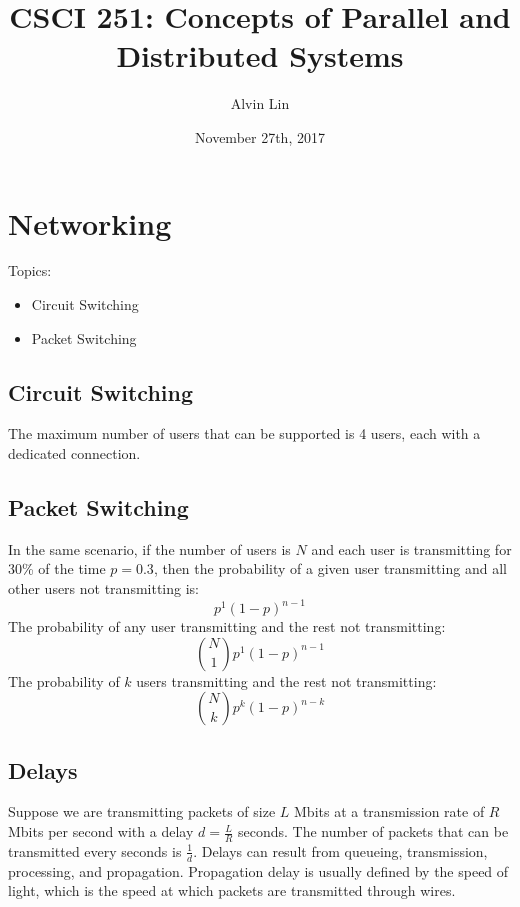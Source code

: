 \documentclass{math}
\title{CSCI 251: Concepts of Parallel and Distributed Systems}
\author{Alvin Lin}
\date{November 27th, 2017}
\begin{document}
\maketitle

\section*{Networking}
Topics:
\begin{itemize}
  \item Circuit Switching
  \item Packet Switching
\end{itemize}

\subsection*{Circuit Switching}
\begin{center}
\end{center}
The maximum number of users that can be supported is 4 users, each with a
dedicated connection.

\subsection*{Packet Switching}
In the same scenario, if the number of users is \( N \) and each user is
transmitting for 30\% of the time \( p = 0.3 \), then the probability of a
given user transmitting and all other users not transmitting is:
\[ p^1(1-p)^{n-1} \]
The probability of any user transmitting and the rest not transmitting:
\[ \binom{N}{1}p^1(1-p)^{n-1} \]
The probability of \( k \) users transmitting and the rest not transmitting:
\[ \binom{N}{k}p^k(1-p)^{n-k} \]

\subsection*{Delays}
Suppose we are transmitting packets of size \( L \) Mbits at a transmission rate
of \( R \) Mbits per second with a delay \( d = \frac{L}{R} \) seconds. The
number of packets that can be transmitted every seconds is \( \frac{1}{d} \).
Delays can result from queueing, transmission, processing, and propagation.
Propagation delay is usually defined by the speed of light, which is the speed
at which packets are transmitted through wires.
\end{document}
